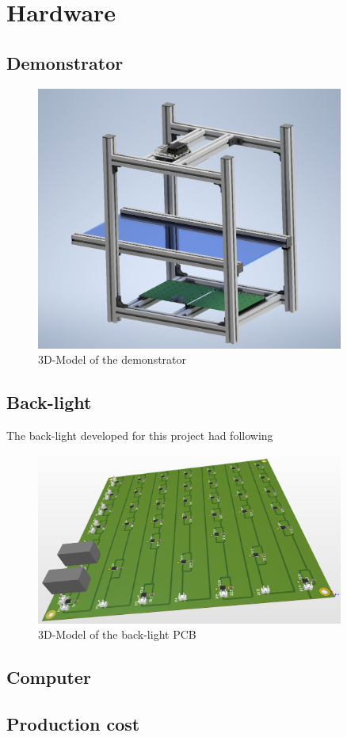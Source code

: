 \section{Hardware}

\subsection{Demonstrator}

\begin{figure}[ht]
	\centering
	\includegraphics[width=0.9\textwidth]{3-development/images/Demonstrator.png}
	\caption{3D-Model of the demonstrator\label{development:demo}}
\end{figure} 
\newpage

\subsection{Back-light}
The back-light developed for this project had following 
\begin{figure}[ht]
	\centering
	\includegraphics[width=0.9\textwidth]{3-development/images/Backlight.png}
	\caption{3D-Model of the back-light PCB\label{development:pcb}}
\end{figure} 

\subsection{Computer}



\subsection{Production cost}